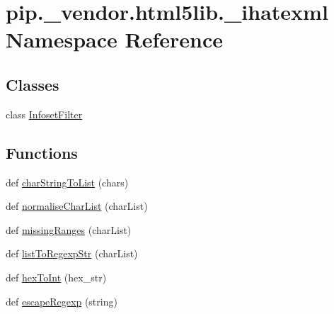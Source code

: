 \hypertarget{namespacepip_1_1__vendor_1_1html5lib_1_1__ihatexml}{}\section{pip.\+\_\+vendor.\+html5lib.\+\_\+ihatexml Namespace Reference}
\label{namespacepip_1_1__vendor_1_1html5lib_1_1__ihatexml}
\subsection*{Classes}
\begin{DoxyCompactItemize}
\item 
class \hyperlink{classpip_1_1__vendor_1_1html5lib_1_1__ihatexml_1_1InfosetFilter}{Infoset\+Filter}
\end{DoxyCompactItemize}
\subsection*{Functions}
\begin{DoxyCompactItemize}
\item 
def \hyperlink{namespacepip_1_1__vendor_1_1html5lib_1_1__ihatexml_a5a0489f9bbcaac7fbe87dc3139f60e10}{char\+String\+To\+List} (chars)
\item 
def \hyperlink{namespacepip_1_1__vendor_1_1html5lib_1_1__ihatexml_a783fe09247d1ef5d055fc2e06fd21fb4}{normalise\+Char\+List} (char\+List)
\item 
def \hyperlink{namespacepip_1_1__vendor_1_1html5lib_1_1__ihatexml_a68652ed1093532e54907751cede8d664}{missing\+Ranges} (char\+List)
\item 
def \hyperlink{namespacepip_1_1__vendor_1_1html5lib_1_1__ihatexml_ac699a64b50572ee89e2606564dc0663a}{list\+To\+Regexp\+Str} (char\+List)
\item 
def \hyperlink{namespacepip_1_1__vendor_1_1html5lib_1_1__ihatexml_a571755fac5e336523d20c25d43db0a4f}{hex\+To\+Int} (hex\+\_\+str)
\item 
def \hyperlink{namespacepip_1_1__vendor_1_1html5lib_1_1__ihatexml_a459372bb955f704b6b1c1e6fe127094d}{escape\+Regexp} (string)
\end{DoxyCompactItemize}
